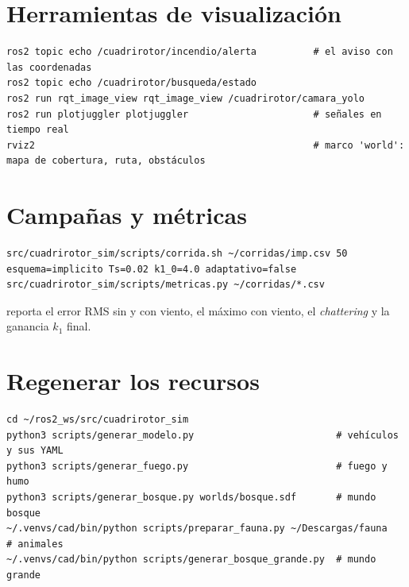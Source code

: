 \section{Herramientas de visualización}

\begin{lstlisting}[style=bash]
ros2 topic echo /cuadrirotor/incendio/alerta          # el aviso con las coordenadas
ros2 topic echo /cuadrirotor/busqueda/estado
ros2 run rqt_image_view rqt_image_view /cuadrirotor/camara_yolo
ros2 run plotjuggler plotjuggler                      # señales en tiempo real
rviz2                                                 # marco 'world': mapa de cobertura, ruta, obstáculos
\end{lstlisting}

\section{Campañas y métricas}

\begin{lstlisting}[style=bash]
src/cuadrirotor_sim/scripts/corrida.sh ~/corridas/imp.csv 50 esquema=implicito Ts=0.02 k1_0=4.0 adaptativo=false
src/cuadrirotor_sim/scripts/metricas.py ~/corridas/*.csv
\end{lstlisting}
 reporta el error RMS sin y con viento, el máximo con viento, el
\emph{chattering} y la ganancia $k_1$ final.

\section{Regenerar los recursos}

\begin{lstlisting}[style=bash]
cd ~/ros2_ws/src/cuadrirotor_sim
python3 scripts/generar_modelo.py                         # vehículos y sus YAML
python3 scripts/generar_fuego.py                          # fuego y humo
python3 scripts/generar_bosque.py worlds/bosque.sdf       # mundo bosque
~/.venvs/cad/bin/python scripts/preparar_fauna.py ~/Descargas/fauna   # animales
~/.venvs/cad/bin/python scripts/generar_bosque_grande.py  # mundo grande
\end{lstlisting}
